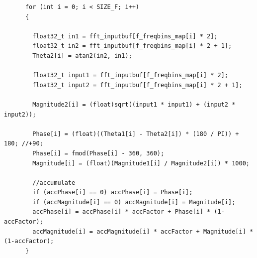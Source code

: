 \begin{lstlisting}
      for (int i = 0; i < SIZE_F; i++)
      {

        float32_t in1 = fft_inputbuf[f_freqbins_map[i] * 2];
        float32_t in2 = fft_inputbuf[f_freqbins_map[i] * 2 + 1];
        Theta2[i] = atan2(in2, in1);

        float32_t input1 = fft_inputbuf[f_freqbins_map[i] * 2];
        float32_t input2 = fft_inputbuf[f_freqbins_map[i] * 2 + 1];

        Magnitude2[i] = (float)sqrt((input1 * input1) + (input2 * input2));

        Phase[i] = (float)((Theta1[i] - Theta2[i]) * (180 / PI)) + 180; //+90;
        Phase[i] = fmod(Phase[i] - 360, 360);
        Magnitude[i] = (float)(Magnitude1[i] / Magnitude2[i]) * 1000;

        //accumulate
        if (accPhase[i] == 0) accPhase[i] = Phase[i];
        if (accMagnitude[i] == 0) accMagnitude[i] = Magnitude[i];
        accPhase[i] = accPhase[i] * accFactor + Phase[i] * (1-accFactor);
        accMagnitude[i] = accMagnitude[i] * accFactor + Magnitude[i] * (1-accFactor);
      }
\end{lstlisting}

